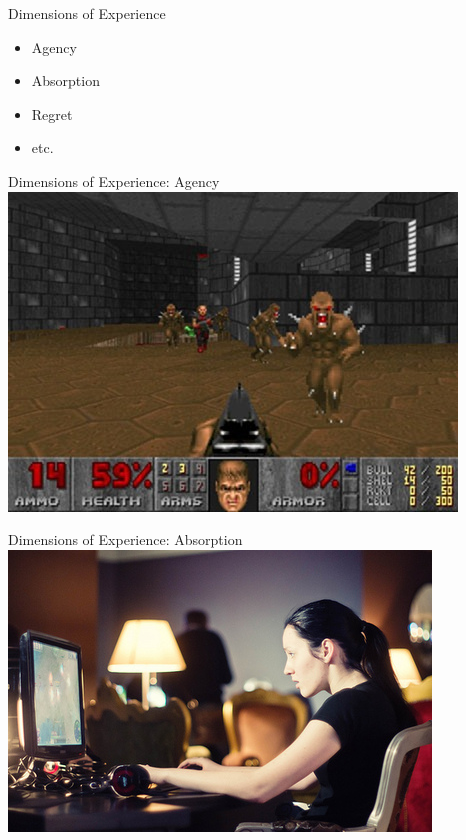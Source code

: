 \documentclass[xcolor=x11names]{beamer}
\begin{document}
\begin{frame}{Dimensions of Experience}
  \begin{itemize}
    \item Agency
    \item Absorption
    \item Regret
    \item etc.
  \end{itemize}
\end{frame}

\begin{frame}{Dimensions of Experience: Agency}
  \includegraphics[width=\textwidth]{res/doom-screenshot.jpg}
\end{frame}

\begin{frame}{Dimensions of Experience: Absorption}
  \includegraphics[width=\textwidth]{res/absorbed-player.jpg}
\end{frame}
\end{document}
